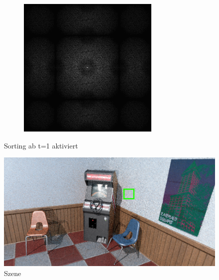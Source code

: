 \begin{figure}[H]
\begin{tcolorbox}[boxrule=4pt,sharp corners=downhill,title=Sortieren]
\begin{subfigure}[b]{0.2\textwidth}
        \includegraphics[width=\textwidth]{content/TemporalerAlg/Bilder/Sorting/Spektren/Ausschnitt4.png}
        \label{pic:sorting_t4_FFT}
    \end{subfigure}
    \end{tcolorbox}
    \caption{Sorting ab t=1 aktiviert}
    \label{pic:Sorting_over_seven_frames}
\end{figure}


\begin{figure}[H]
    \centering \includegraphics[scale=.25]{content/TemporalerAlg/Bilder/Sorting/Szene/Szene7.png}
    \caption{Szene}
    \label{fig:Nur_Sorting_Szene_t7}
\end{figure}


